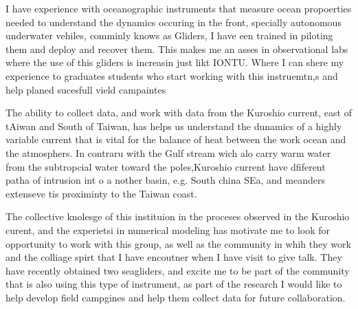 \documentclass[letterpaper, 12pt ]{article}
\begin{document}
I have experience with oceanographic instruments that measure ocean propoerties needed to understand the dynamics occuring in the front, specially autonomous underwater vehiles, comminly knows as Gliders, I have een trained in piloting them and deploy and recover them. This makes me an asses in observational labs where the use of this gliders is increasin just likt IONTU. Where I can shere my experience to graduates students who start working with this instruemtn,s and help planed sucesfull vield campaintes

The ability to collect data, and work with data from the Kuroshio current, east of tAiwan and South of Taiwan, has helps us understand the dunamics of a highly variable current  that is vital for the balance of heat between the work ocean and the atmosphers. In contraru with the Gulf stream wich alo carry warm water from the subtropcial water toward the poles,Kuroshio current have dfiferent patha of intrusion int o a nother basin, e.g. South china SEa, and meanders extenseve tis proximinty to the Taiwan coast.

The collective knolesge of this instituion in the proceses observed in the Kuroshio curent, and the experietsi in numerical modeling has motivate me to look for opportunity to work with this group, as well as the community in whih they work and the colliage spirt that I have encoutner when I have visit to give  talk. 
They have recently obtained two seagliders, and excite me to be part of the community that is also using this type of instrument, as part of the research I would like to help develop field campgines and help them collect data for future collaboration. 
\end{document}
